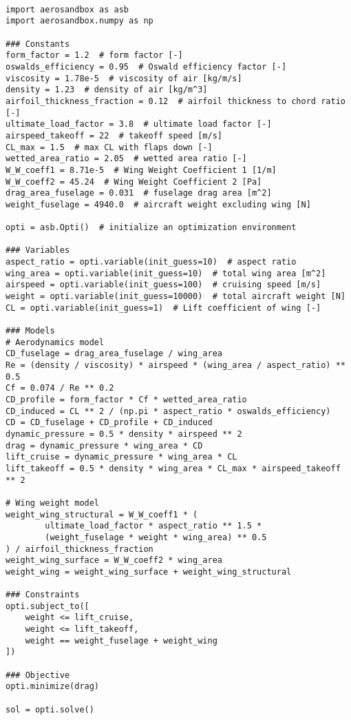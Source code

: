\begin{verbatim}

import aerosandbox as asb
import aerosandbox.numpy as np

### Constants
form_factor = 1.2  # form factor [-]
oswalds_efficiency = 0.95  # Oswald efficiency factor [-]
viscosity = 1.78e-5  # viscosity of air [kg/m/s]
density = 1.23  # density of air [kg/m^3]
airfoil_thickness_fraction = 0.12  # airfoil thickness to chord ratio [-]
ultimate_load_factor = 3.8  # ultimate load factor [-]
airspeed_takeoff = 22  # takeoff speed [m/s]
CL_max = 1.5  # max CL with flaps down [-]
wetted_area_ratio = 2.05  # wetted area ratio [-]
W_W_coeff1 = 8.71e-5  # Wing Weight Coefficient 1 [1/m]
W_W_coeff2 = 45.24  # Wing Weight Coefficient 2 [Pa]
drag_area_fuselage = 0.031  # fuselage drag area [m^2]
weight_fuselage = 4940.0  # aircraft weight excluding wing [N]

opti = asb.Opti()  # initialize an optimization environment

### Variables
aspect_ratio = opti.variable(init_guess=10)  # aspect ratio
wing_area = opti.variable(init_guess=10)  # total wing area [m^2]
airspeed = opti.variable(init_guess=100)  # cruising speed [m/s]
weight = opti.variable(init_guess=10000)  # total aircraft weight [N]
CL = opti.variable(init_guess=1)  # Lift coefficient of wing [-]

### Models
# Aerodynamics model
CD_fuselage = drag_area_fuselage / wing_area
Re = (density / viscosity) * airspeed * (wing_area / aspect_ratio) ** 0.5
Cf = 0.074 / Re ** 0.2
CD_profile = form_factor * Cf * wetted_area_ratio
CD_induced = CL ** 2 / (np.pi * aspect_ratio * oswalds_efficiency)
CD = CD_fuselage + CD_profile + CD_induced
dynamic_pressure = 0.5 * density * airspeed ** 2
drag = dynamic_pressure * wing_area * CD
lift_cruise = dynamic_pressure * wing_area * CL
lift_takeoff = 0.5 * density * wing_area * CL_max * airspeed_takeoff ** 2

# Wing weight model
weight_wing_structural = W_W_coeff1 * (
        ultimate_load_factor * aspect_ratio ** 1.5 *
        (weight_fuselage * weight * wing_area) ** 0.5
) / airfoil_thickness_fraction
weight_wing_surface = W_W_coeff2 * wing_area
weight_wing = weight_wing_surface + weight_wing_structural

### Constraints
opti.subject_to([
    weight <= lift_cruise,
    weight <= lift_takeoff,
    weight == weight_fuselage + weight_wing
])

### Objective
opti.minimize(drag)

sol = opti.solve()

\end{verbatim}


